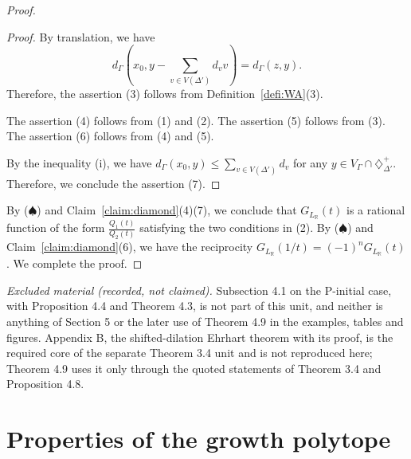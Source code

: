 \documentclass[10pt,a4paper]{amsart}
\theoremstyle{plain}
\theoremstyle{definition}
\theoremstyle{remark}
\begin{document}
\begin{proof}
\begin{proof}
By translation, we have 
\[
d_{\Gamma} \left( x_0, y - \sum _{v \in V(\Delta ')} d_v v \right)
= d_{\Gamma} (z, y). 
\]
Therefore, the assertion (3) follows from Definition~\ref{defi:WA}(3). 

The assertion (4) follows from (1) and (2). 
The assertion (5) follows from (3). 
The assertion (6) follows from (4) and (5). 

By the inequality (i), we have $d_{\Gamma}(x_0, y) \le \sum _{v \in V(\Delta ')} d_v$ for 
any $y \in V_{\Gamma} \cap \diamondsuit^+ _{\Delta '}$. 
Therefore, we conclude the assertion (7). 
\end{proof}
By ($\spadesuit$) and Claim~\ref{claim:diamond}(4)(7),
we conclude that $G_{L_{\mathbb{R}}}(t)$ is a rational function of the form 
$\frac{Q_1(t)}{Q_2(t)}$ satisfying the two conditions in (2). 
By ($\spadesuit$) and Claim~\ref{claim:diamond}(6), 
we have the reciprocity $G_{L_{\mathbb{R}}}(1/t) = (-1)^n G_{L_{\mathbb{R}}}(t)$. 
We complete the proof. 
\end{proof}

\noindent\textit{Excluded material (recorded, not claimed).} Subsection 4.1 on the P-initial case, with Proposition 4.4 and Theorem 4.3, is not part of this unit, and neither is anything of Section 5 or the later use of Theorem 4.9 in the examples, tables and figures. Appendix B, the shifted-dilation Ehrhart theorem with its proof, is the required core of the separate Theorem 3.4 unit and is not reproduced here; Theorem 4.9 uses it only through the quoted statements of Theorem 3.4 and Proposition 4.8.
\appendix
\section{Properties of the growth polytope}\label{section:GP}
\end{document}
